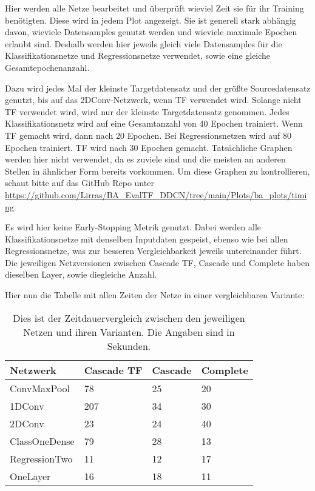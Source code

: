 Hier werden alle Netze bearbeitet und überprüft wieviel Zeit sie für ihr Training benötigten. 
Diese wird in jedem Plot angezeigt. Sie ist generell stark abhängig davon, wieviele Datensamples genutzt werden und 
wieviele maximale Epochen erlaubt sind. Deshalb werden hier jeweils gleich viele Datensamples für die Klassifikationsnetze und 
Regressionsnetze verwendet, sowie eine gleiche Gesamtepochenanzahl. 

Dazu wird jedes Mal der kleinste Targetdatensatz und der größte Sourcedatensatz genutzt, bis auf das 2DConv-Netzwerk, wenn TF verwendet wird. 
Solange nicht TF verwendet wird, wird nur der kleinste Targetdatensatz genommen. Jedes Klassifikationsnetz 
wird auf eine Gesamtanzahl von 40 Epochen trainiert. Wenn TF gemacht wird, dann nach 20 Epochen. Bei Regressionsnetzen wird auf 80 Epochen 
trainiert. TF wird nach 30 Epochen gemacht. Tatsächliche Graphen werden hier nicht verwendet, da es zuviele sind und die meisten an 
anderen Stellen in ähnlicher Form bereits vorkommen. Um diese Graphen zu kontrollieren, schaut bitte auf das GitHub Repo unter 
\url{https://github.com/Lirras/BA_EvalTF_DDCN/tree/main/Plots/ba_plots/timing}. 

Es wird hier keine Early-Stopping Metrik genutzt. 
Dabei werden alle Klassifikationsnetze mit denselben Inputdaten gespeist, ebenso wie bei allen Regressionsnetze, was zur besseren 
Vergleichbarkeit jeweils untereinander führt. 
Die jeweiligen Netzversionen zwischen Cascade TF, Cascade und Complete haben dieselben Layer, sowie diegleiche Anzahl. 

Hier nun die Tabelle mit allen Zeiten der Netze in einer vergleichbaren Variante: \newline

\begin{table}[h!]
    \begin{center} 
        \begin{tabular}{l|l|l|l}
            \textbf{Netzwerk} & \textbf{Cascade TF} & \textbf{Cascade} & \textbf{Complete} \\
            \hline
            ConvMaxPool & 78 & 25 & 20 \\
            1DConv & 207 & 34 & 30 \\
            2DConv & 23 & 24 & 40 \\
            ClassOneDense & 79 & 28 & 13 \\
            RegressionTwo & 11 & 12 & 17 \\
            OneLayer & 16 & 18 & 11
        \end{tabular}
        \caption{
            \small{Dies ist der Zeitdauervergleich zwischen den jeweiligen Netzen und ihren Varianten. Die Angaben sind in Sekunden.}}
        \label{tab:time}
    \end{center}
\end{table}

